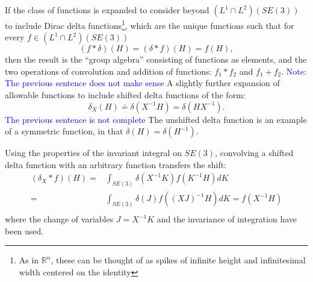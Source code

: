 \documentclass[twocolumn,10pt]{asme2ej}
\begin{document}
If the class of functions is expanded to consider beyond $(L^1 \cap L^2)(SE(3))$
to include Dirac delta functions\footnote{As in $\mathbb{R}^n$, these can be thought of as spikes
of infinite height and infinitesimal width centered on the identity}, which are the unique functions such that for every $f \in (L^1 \cap L^2)(SE(3))$
$$ (f * \delta)(H) = (\delta * f)(H) = f(H), $$
then the result is the ``group algebra'' consisting of functions as elements, and the two operations of convolution and addition of
functions: $f_1*f_2$ and $f_1 + f_2$. \textcolor{blue}{Note: The previous sentence does not make sense} A slightly further expansion of allowable functions to include shifted delta functions of the form:
$$ \delta_X(H) \doteq \delta(X^{-1} H) = \delta( H X^{-1}). $$
\textcolor{blue}{The previous sentence is not complete}
The unshifted delta function is an example of a symmetric function, in that $\delta(H) = \delta(H^{-1})$.

Using the properties of the invariant integral on $SE(3)$, convolving a shifted delta function with an arbitrary
function transfers the shift:
\begin{equation}
\begin{split}
(\delta_X * f)(H) =& \int_{SE(3)} \delta(X^{-1} K) f(K^{-1} H) dK \\
=& \int_{SE(3)} \delta(J) f((XJ)^{-1} H) dK = f(X^{-1} H) \\
\end{split}
\end{equation}
where the change of variables $J = X^{-1} K$ and the invariance of integration have been used.

\end{document}
